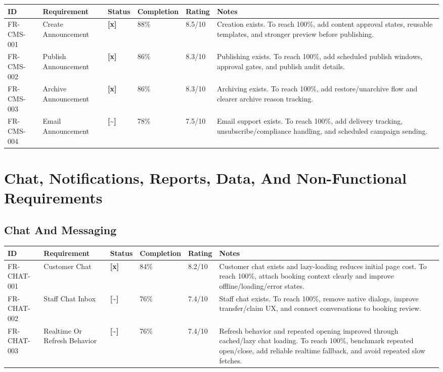 \documentclass[11pt,a4paper]{article}
\newcommand{\statusdone}{\textbf{[x]}}
\newcommand{\statuspartial}{\textbf{[{\textasciitilde}]}}
\begin{document}
\begin{longtable}{L{0.15\textwidth} L{0.22\textwidth} C{0.08\textwidth} C{0.10\textwidth} C{0.10\textwidth} L{0.25\textwidth}}
\toprule
\textbf{ID} & \textbf{Requirement} & \textbf{Status} & \textbf{Completion} & \textbf{Rating} & \textbf{Notes} \\
\midrule
FR-CMS-001 & Create Announcement & \statusdone & 88\% & 8.5/10 & Creation exists. To reach 100\%, add content approval states, reusable templates, and stronger preview before publishing. \\
FR-CMS-002 & Publish Announcement & \statusdone & 86\% & 8.3/10 & Publishing exists. To reach 100\%, add scheduled publish windows, approval gates, and publish audit details. \\
FR-CMS-003 & Archive Announcement & \statusdone & 86\% & 8.3/10 & Archiving exists. To reach 100\%, add restore/unarchive flow and clearer archive reason tracking. \\
FR-CMS-004 & Email Announcement & \statuspartial & 78\% & 7.5/10 & Email support exists. To reach 100\%, add delivery tracking, unsubscribe/compliance handling, and scheduled campaign sending. \\
\bottomrule
\end{longtable}

\section{Chat, Notifications, Reports, Data, And Non-Functional Requirements}

\subsection{Chat And Messaging}

\begin{longtable}{L{0.15\textwidth} L{0.22\textwidth} C{0.08\textwidth} C{0.10\textwidth} C{0.10\textwidth} L{0.25\textwidth}}
\toprule
\textbf{ID} & \textbf{Requirement} & \textbf{Status} & \textbf{Completion} & \textbf{Rating} & \textbf{Notes} \\
\midrule
FR-CHAT-001 & Customer Chat & \statusdone & 84\% & 8.2/10 & Customer chat exists and lazy-loading reduces initial page cost. To reach 100\%, attach booking context clearly and improve offline/loading/error states. \\
FR-CHAT-002 & Staff Chat Inbox & \statuspartial & 76\% & 7.4/10 & Staff chat exists. To reach 100\%, remove native dialogs, improve transfer/claim UX, and connect conversations to booking review. \\
FR-CHAT-003 & Realtime Or Refresh Behavior & \statuspartial & 76\% & 7.4/10 & Refresh behavior and repeated opening improved through cached/lazy chat loading. To reach 100\%, benchmark repeated open/close, add reliable realtime fallback, and avoid repeated slow fetches. \\
\bottomrule
\end{longtable}
\end{document}
